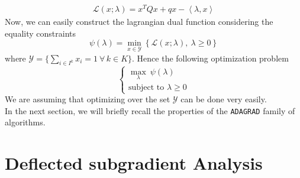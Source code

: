 \documentclass[notitlepage]{article}
\begin{document}
\begin{align*}
  \mathcal{L}(x;\lambda) = x^T Q x + q x - \left\langle \lambda,x \right\rangle 
\end{align*}
Now, we can easily construct the lagrangian dual function considering the equality constraints
\[
  \psi(\lambda) = \min_{x \in \mathcal{Y}} \left\lbrace \mathcal{L}(x;\lambda) ,\ \lambda \ge 0 \right\rbrace
\]
where $\mathcal{Y} = \{\sum_{i \in I^k} x_i = 1 \ \forall\, k \in K\}$. Hence the following optimization problem
\begin{equation}
  \begin{cases}
    \max_{\lambda}\  \psi(\lambda)  \\
    \text{subject to } \lambda \ge 0 
  \end{cases}
  \label{eqn:dual_problem}  
  \tag{$D$}
\end{equation}
We are assuming that optimizing over the set $\mathcal{Y}$ can be done very easily.\\ 
In the next section, we will briefly recall the properties of the \texttt{ADAGRAD} family of algorithms\cite{JMLR:v12:duchi11a}.%

\section{Deflected subgradient Analysis}
\end{document}
